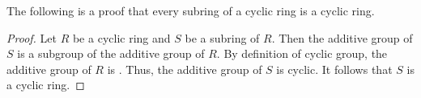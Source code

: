 \documentclass[12pt]{article}
\begin{document}

The following is a proof that every subring of a cyclic ring is a cyclic ring.

\begin{proof}
Let $R$ be a cyclic ring and $S$ be a subring of $R$.  Then the additive group of $S$ is a subgroup of the additive group of $R$.  By definition of cyclic group, the additive group of $R$ is .  Thus, the additive group of $S$ is cyclic.  It follows that $S$ is a cyclic ring.
\end{proof}
\end{document}
